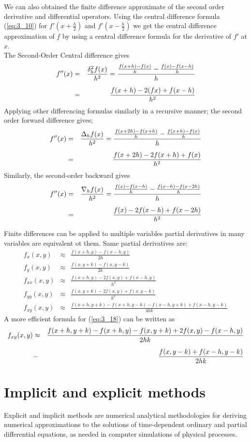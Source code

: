 \documentclass[11pt]{report}
\newcommand{\sps}{\\[0.2cm]}
\newcommand{\refn}[1]{(\ref{#1})}
\newcommand{\refx}[1]{\refn{eq:#1}}
\newcommand{\dsp}{\displaystyle}
\newcommand{\NI}{\noindent}
\begin{document}
	\NI We can also obtained the finite difference approximate of the second order derivative and differential operators. Using the central difference formula \refx{3_10} for $\dsp f'(x + \frac{h}{2})$ and $\dsp f'(x - \frac{h}{2})$ we get the central difference approximation of $f$ by using a central difference formula for the derivative of $f'$ at $x$.\sps
	The Second-Order Central difference gives
	\begin{eqnarray}
		f''(x) &=& \frac{\delta^2_h f(x)}{h^2} = \frac{\frac{f(x+h) - f(x)}{h} - \frac{f(x)- f(x-h)}{h}}{h} \notag \sps
		&=& \frac{f(x+h) - 2(fx) + f(x-h)}{h^2}
	\end{eqnarray}
	Applying other differencing formulas similarly in a recursive manner; the second order forward difference gives;
	\begin{eqnarray}
		f''(x) &=& \frac{\Delta_h f(x)}{h^2} = \frac{\frac{f(x+2h)-f(x+h)}{h} - \frac{f(x+h)-f(x)}{h}}{h}\notag\sps
		&=& \frac{f(x+2h) - 2f(x+h)+f(x)}{h^2}
	\end{eqnarray}
	Similarly, the second-order backward gives
		\begin{eqnarray}
		f''(x) &=& \frac{\nabla_h f(x)}{h^2} = \frac{\frac{f(x)-f(x-h)}{h} - \frac{f(x-h) -f(x-2h)}{h}}{h}\notag\sps
		&=& \frac{f(x) - 2f(x-h) + f(x-2h)}{h^2}
	\end{eqnarray}
		
	\NI Finite differences can be applied to multiple variables partial derivatives in many variables are equivalent ot  them. Same partial derivatives are:
	\begin{eqnarray}
		f_x(x,y) &\approx& \frac{f(x+h, y) - f(x-h,y)}{2h}\sps
		f_y(x,y) &\approx& \frac{f(x, y+k) - f(x,y-k)}{2k}\sps
		f_{xx}(x,y) &\approx& \frac{f(x+h,y) - 2f(x,y) + f(x-h,y)}{h^2}\sps
		f_{yy}(x,y) &\approx& \frac{f(x,y+k) - 2f(x,y) + f(x,y-k)}{k^2}\sps
		f_{xy}(x,y) &\approx& \frac{f(x+h, y+k) - f(x+h, y-k) - f(x-h,y+k) + f(x-h, y-k)}{4hk}\label{eq:3_18}
	\end{eqnarray}
	A more efficient formula for \refx{3_18} can be written as
	\begin{eqnarray}
		f_{xy}(x,y) &\approx& \frac{f(x+h, y+k) - f(x+h, y) - f(x,y+k) + 2f(x,y) - f(x-h,y)}{2hk} \notag\sps
		& -& \frac{f(x,y-k) + f(x-h,y-k)}{2hk}\label{eq:3_19}
	\end{eqnarray}

	\section{Implicit and explicit methods}
	Explicit and implicit methods are numerical analytical methodologies for deriving numerical approximations to the solutions of time-dependent ordinary and partial differential equations, as needed in computer simulations of physical processes.\sps
	
\end{document}
